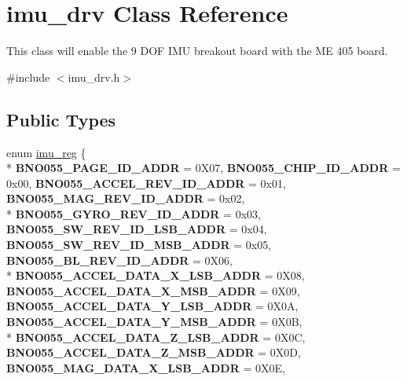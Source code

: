 \hypertarget{classimu__drv}{\section{imu\-\_\-drv Class Reference}
\label{classimu__drv}
}


This class will enable the 9 D\-O\-F I\-M\-U breakout board with the M\-E 405 board.  




{\ttfamily \#include $<$imu\-\_\-drv.\-h$>$}

\subsection*{Public Types}
\begin{DoxyCompactItemize}
\item 
enum \hyperlink{classimu__drv_ae3b2e2b681ec835e7686c7b333a53cb9}{imu\-\_\-reg} \{ \\*
{\bfseries B\-N\-O055\-\_\-\-P\-A\-G\-E\-\_\-\-I\-D\-\_\-\-A\-D\-D\-R} = 0\-X07, 
{\bfseries B\-N\-O055\-\_\-\-C\-H\-I\-P\-\_\-\-I\-D\-\_\-\-A\-D\-D\-R} = 0x00, 
{\bfseries B\-N\-O055\-\_\-\-A\-C\-C\-E\-L\-\_\-\-R\-E\-V\-\_\-\-I\-D\-\_\-\-A\-D\-D\-R} = 0x01, 
{\bfseries B\-N\-O055\-\_\-\-M\-A\-G\-\_\-\-R\-E\-V\-\_\-\-I\-D\-\_\-\-A\-D\-D\-R} = 0x02, 
\\*
{\bfseries B\-N\-O055\-\_\-\-G\-Y\-R\-O\-\_\-\-R\-E\-V\-\_\-\-I\-D\-\_\-\-A\-D\-D\-R} = 0x03, 
{\bfseries B\-N\-O055\-\_\-\-S\-W\-\_\-\-R\-E\-V\-\_\-\-I\-D\-\_\-\-L\-S\-B\-\_\-\-A\-D\-D\-R} = 0x04, 
{\bfseries B\-N\-O055\-\_\-\-S\-W\-\_\-\-R\-E\-V\-\_\-\-I\-D\-\_\-\-M\-S\-B\-\_\-\-A\-D\-D\-R} = 0x05, 
{\bfseries B\-N\-O055\-\_\-\-B\-L\-\_\-\-R\-E\-V\-\_\-\-I\-D\-\_\-\-A\-D\-D\-R} = 0\-X06, 
\\*
{\bfseries B\-N\-O055\-\_\-\-A\-C\-C\-E\-L\-\_\-\-D\-A\-T\-A\-\_\-\-X\-\_\-\-L\-S\-B\-\_\-\-A\-D\-D\-R} = 0\-X08, 
{\bfseries B\-N\-O055\-\_\-\-A\-C\-C\-E\-L\-\_\-\-D\-A\-T\-A\-\_\-\-X\-\_\-\-M\-S\-B\-\_\-\-A\-D\-D\-R} = 0\-X09, 
{\bfseries B\-N\-O055\-\_\-\-A\-C\-C\-E\-L\-\_\-\-D\-A\-T\-A\-\_\-\-Y\-\_\-\-L\-S\-B\-\_\-\-A\-D\-D\-R} = 0\-X0\-A, 
{\bfseries B\-N\-O055\-\_\-\-A\-C\-C\-E\-L\-\_\-\-D\-A\-T\-A\-\_\-\-Y\-\_\-\-M\-S\-B\-\_\-\-A\-D\-D\-R} = 0\-X0\-B, 
\\*
{\bfseries B\-N\-O055\-\_\-\-A\-C\-C\-E\-L\-\_\-\-D\-A\-T\-A\-\_\-\-Z\-\_\-\-L\-S\-B\-\_\-\-A\-D\-D\-R} = 0\-X0\-C, 
{\bfseries B\-N\-O055\-\_\-\-A\-C\-C\-E\-L\-\_\-\-D\-A\-T\-A\-\_\-\-Z\-\_\-\-M\-S\-B\-\_\-\-A\-D\-D\-R} = 0\-X0\-D, 
{\bfseries B\-N\-O055\-\_\-\-M\-A\-G\-\_\-\-D\-A\-T\-A\-\_\-\-X\-\_\-\-L\-S\-B\-\_\-\-A\-D\-D\-R} = 0\-X0\-E, 

\end{DoxyCompactItemize}
